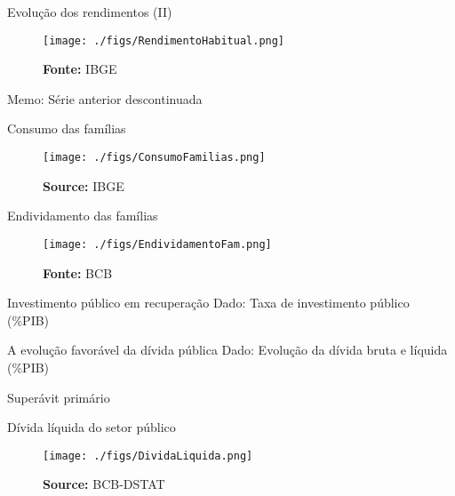 \documentclass[presentation]{beamer}
\begin{document}
\begin{frame}[label={sec:orgce02e13}]{Evolução dos rendimentos (II)}
\begin{figure}[htb]
\centering
\caption{Massa de rendimento real habitual de todos os trabalhos} 
\texttt{[image: ./figs/RendimentoHabitual.png]}
\label{fig:RendimentoH}
\caption*{\textbf{Fonte:} IBGE}
\end{figure}

\alert{Memo:} Série anterior descontinuada
\end{frame}

\begin{frame}[label={sec:orge4e605d}]{Consumo das famílias}
\begin{figure}[htb]
\centering
\caption{Consumo das famílias\\Jan/1995=100} 
\texttt{[image: ./figs/ConsumoFamilias.png]}
\label{fig:Consumo}
\caption*{\textbf{Source:} IBGE}
\end{figure}
\end{frame}

\begin{frame}[label={sec:orgc4c25a8}]{Endividamento das famílias}
\begin{figure}[htb]
\centering
\caption{Endividamento das famílias\\em \% do PIB} 
\texttt{[image: ./figs/EndividamentoFam.png]}
\label{fig:Endiv}
\caption*{\textbf{Fonte:} BCB}
\end{figure}
\end{frame}


\begin{frame}[label={sec:orgc7a9050}]{Investimento público em recuperação}
\alert{Dado:} Taxa de investimento público (\%PIB)
\end{frame}

\begin{frame}[label={sec:org678f90d}]{A evolução favorável da dívida pública}
\alert{Dado:} Evolução da dívida bruta e líquida (\%PIB)
\end{frame}

\begin{frame}[label={sec:orgaae9082}]{Superávit primário}
\end{frame}

\begin{frame}[label={sec:orgbb5d0f3}]{Dívida líquida do setor público}
\begin{figure}[htb]
\centering
\caption{Dívida líquida do Governo Federal e Banco Central\\em \% do PIB} 
\texttt{[image: ./figs/DividaLiquida.png]}
\label{fig:divliq}
\caption*{\textbf{Source:} BCB-DSTAT}
\end{figure}
\end{frame}
\end{document}
